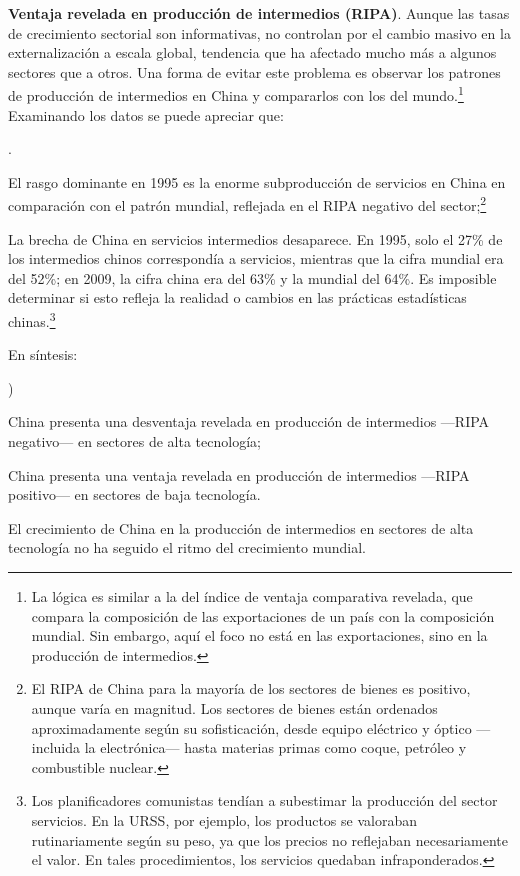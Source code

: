 \documentclass[10pt,a4paper]{article}
\newcounter{alphaitem}
\newcounter{numitem}
\newenvironment{la}
      {\begin{list}{\alph{alphaitem})}{%
          \usecounter{alphaitem}%
          \setlength{\leftmargin}{1cm}%
          \setlength{\parskip}{3pt}%
          \setlength{\itemsep}{0pt}%
          \setlength{\parsep}{0pt}%
      }}
      {\end{list}}
\newenvironment{lnum}
      {\begin{list}{\arabic{numitem}.}{%
          \usecounter{numitem}%
          \setlength{\leftmargin}{1cm}%
          \setlength{\parskip}{3pt}%
          \setlength{\itemsep}{0pt}%
          \setlength{\parsep}{0pt}%
      }}
      {\end{list}}
\begin{document}
\textbf{Ventaja revelada en producción de intermedios (RIPA)}. Aunque las tasas de crecimiento sectorial son informativas, no controlan por el cambio masivo en la externalización a escala global, tendencia que ha afectado mucho más a algunos sectores que a otros. Una forma de evitar este problema es observar los patrones de producción de intermedios en China y compararlos con los del mundo.\footnote{%
    La lógica es similar a la del índice de ventaja comparativa revelada, que compara la composición de las exportaciones de un país con la composición mundial. Sin embargo, aquí el foco no está en las exportaciones, sino en la producción de intermedios.
} Examinando los datos se puede apreciar que:
\begin{lnum}
    \item El rasgo dominante en 1995 es la enorme subproducción de servicios en China en comparación con el patrón mundial, reflejada en el RIPA negativo del sector;\footnote{%
        El RIPA de China para la mayoría de los sectores de bienes es positivo, aunque varía en magnitud. Los sectores de bienes están ordenados aproximadamente según su sofisticación, desde equipo eléctrico y óptico —incluida la electrónica— hasta materias primas como coque, petróleo y combustible nuclear.
    }
    \item La brecha de China en servicios intermedios desaparece. En 1995, solo el 27\% de los intermedios chinos correspondía a servicios, mientras que la cifra mundial era del 52\%; en 2009, la cifra china era del 63\% y la mundial del 64\%. Es imposible determinar si esto refleja la realidad o cambios en las prácticas estadísticas chinas.\footnote{%
        Los planificadores comunistas tendían a subestimar la producción del sector servicios. En la URSS, por ejemplo, los productos se valoraban rutinariamente según su peso, ya que los precios no reflejaban necesariamente el valor. En tales procedimientos, los servicios quedaban infraponderados.
    }
\end{lnum}

En síntesis:
\begin{la}
    \item China presenta una desventaja revelada en producción de intermedios —RIPA negativo— en sectores de alta tecnología;
    \item China presenta una ventaja revelada en producción de intermedios —RIPA positivo— en sectores de baja tecnología.
\end{la}

El crecimiento de China en la producción de intermedios en sectores de alta tecnología no ha seguido el ritmo del crecimiento mundial. 
\end{document}
